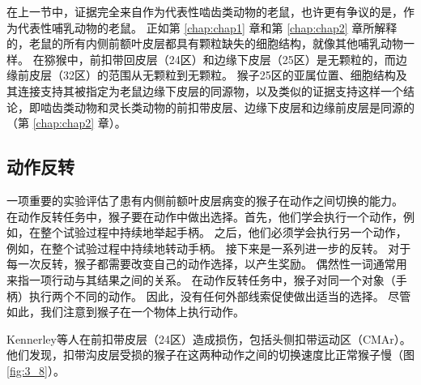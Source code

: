 在上一节中，证据完全来自作为代表性啮齿类动物的老鼠，也许更有争议的是，作为代表性哺乳动物的老鼠。
正如第 \ref{chap:chap1} 章和第 \ref{chap:chap2} 章所解释的，老鼠的所有内侧前额叶皮层都具有颗粒缺失的细胞结构，就像其他哺乳动物一样。
在猕猴中，前扣带回皮层（24区）和边缘下皮层（25区）是无颗粒的，而边缘前皮层（32区）的范围从无颗粒到无颗粒\cite{Vogt&Derbyshire,2009;Mackey&Petrides,2010}。
猴子25区的亚属位置、细胞结构及其连接\cite{freedman2000subcortical}支持其被指定为老鼠边缘下皮层的同源物，以及类似的证据支持这样一个结论，即啮齿类动物和灵长类动物的前扣带皮层、边缘下皮层和边缘前皮层是同源的（第 \ref{chap:chap2} 章）。\par



\subsection{动作反转}

一项重要的实验评估了患有内侧前额叶皮层病变的猴子在动作之间切换的能力\cite{kennerley2006optimal}。
在动作反转任务中，猴子要在动作中做出选择。首先，他们学会执行一个动作，例如，在整个试验过程中持续地举起手柄。
之后，他们必须学会执行另一个动作，例如，在整个试验过程中持续地转动手柄。
接下来是一系列进一步的反转。
对于每一次反转，猴子都需要改变自己的动作选择，以产生奖励。
偶然性一词通常用来指一项行动与其结果之间的关系。
在动作反转任务中，猴子对同一个对象（手柄）执行两个不同的动作。
因此，没有任何外部线索促使做出适当的选择。
尽管如此，我们注意到猴子在一个物体上执行动作。\par
Kennerley等人在前扣带皮层（24区）造成损伤，包括头侧扣带运动区（CMAr）。
他们发现，扣带沟皮层受损的猴子在这两种动作之间的切换速度比正常猴子慢（图\ref{fig:3_8}）。\par


